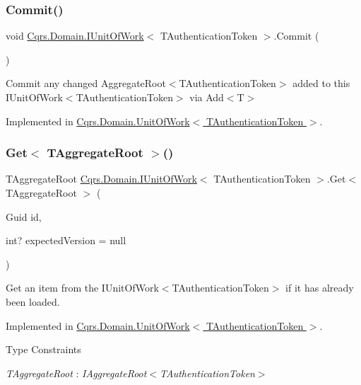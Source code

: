 \subsubsection{\texorpdfstring{Commit()}{Commit()}}
{\footnotesize\ttfamily void \hyperlink{interfaceCqrs_1_1Domain_1_1IUnitOfWork}{Cqrs.\+Domain.\+I\+Unit\+Of\+Work}$<$ T\+Authentication\+Token $>$.Commit (\begin{DoxyParamCaption}{ }\end{DoxyParamCaption})}



Commit any changed Aggregate\+Root$<$\+T\+Authentication\+Token$>$ added to this I\+Unit\+Of\+Work$<$\+T\+Authentication\+Token$>$ via Add$<$\+T$>$ 



Implemented in \hyperlink{classCqrs_1_1Domain_1_1UnitOfWork_a7401e41dd8ce4457551c252ca6402d31_a7401e41dd8ce4457551c252ca6402d31}{Cqrs.\+Domain.\+Unit\+Of\+Work$<$ T\+Authentication\+Token $>$}.

\mbox{\label{interfaceCqrs_1_1Domain_1_1IUnitOfWork_aad3e9f94cbe6941163feb9fe00ddbe06_aad3e9f94cbe6941163feb9fe00ddbe06}} 
\subsubsection{\texorpdfstring{Get$<$ T\+Aggregate\+Root $>$()}{Get< TAggregateRoot >()}}
{\footnotesize\ttfamily T\+Aggregate\+Root \hyperlink{interfaceCqrs_1_1Domain_1_1IUnitOfWork}{Cqrs.\+Domain.\+I\+Unit\+Of\+Work}$<$ T\+Authentication\+Token $>$.Get$<$ T\+Aggregate\+Root $>$ (\begin{DoxyParamCaption}\item[{Guid}]{id,  }\item[{int?}]{expected\+Version = {\ttfamily null} }\end{DoxyParamCaption})}



Get an item from the I\+Unit\+Of\+Work$<$\+T\+Authentication\+Token$>$ if it has already been loaded. 



Implemented in \hyperlink{classCqrs_1_1Domain_1_1UnitOfWork_a1e953136c916aee711068813078aed05_a1e953136c916aee711068813078aed05}{Cqrs.\+Domain.\+Unit\+Of\+Work$<$ T\+Authentication\+Token $>$}.

\begin{Desc}
\item[Type Constraints]\begin{description}
\item[{\em T\+Aggregate\+Root} : {\em I\+Aggregate\+Root$<$T\+Authentication\+Token$>$}]\end{description}
\end{Desc}
